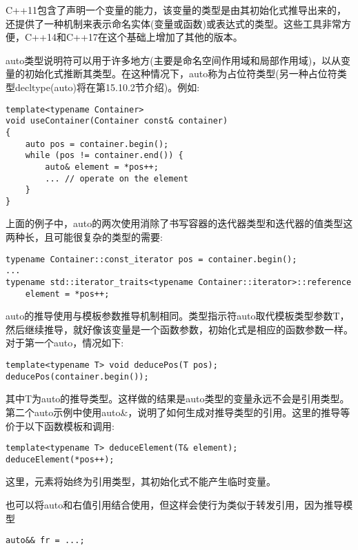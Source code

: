 
C++11包含了声明一个变量的能力，该变量的类型是由其初始化式推导出来的，还提供了一种机制来表示命名实体(变量或函数)或表达式的类型。这些工具非常方便，C++14和C++17在这个基础上增加了其他的版本。


auto类型说明符可以用于许多地方(主要是命名空间作用域和局部作用域)，以从变量的初始化式推断其类型。在这种情况下，auto称为占位符类型(另一种占位符类型decltype(auto)将在第15.10.2节介绍)。例如:

\begin{lstlisting}[style=styleCXX]
template<typename Container>
void useContainer(Container const& container)
{
	auto pos = container.begin();
	while (pos != container.end()) {
		auto& element = *pos++;
		... // operate on the element
	}
}
\end{lstlisting}

上面的例子中，auto的两次使用消除了书写容器的迭代器类型和迭代器的值类型这两种长，且可能很复杂的类型的需要:

\begin{lstlisting}[style=styleCXX]
typename Container::const_iterator pos = container.begin();
...
typename std::iterator_traits<typename Container::iterator>::reference
	element = *pos++;
\end{lstlisting}

auto的推导使用与模板参数推导机制相同。类型指示符auto取代模板类型参数T，然后继续推导，就好像该变量是一个函数参数，初始化式是相应的函数参数一样。对于第一个auto，情况如下:

\begin{lstlisting}[style=styleCXX]
template<typename T> void deducePos(T pos);
deducePos(container.begin());
\end{lstlisting}

其中T为auto的推导类型。这样做的结果是auto类型的变量永远不会是引用类型。第二个auto示例中使用auto\&，说明了如何生成对推导类型的引用。这里的推导等价于以下函数模板和调用:

\begin{lstlisting}[style=styleCXX]
template<typename T> deduceElement(T& element);
deduceElement(*pos++);
\end{lstlisting}

这里，元素将始终为引用类型，其初始化式不能产生临时变量。

也可以将auto和右值引用结合使用，但这样会使行为类似于转发引用，因为推导模型

\begin{lstlisting}[style=styleCXX]
auto&& fr = ...;
\end{lstlisting}

